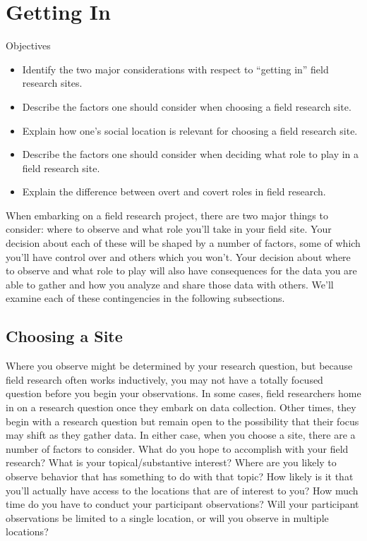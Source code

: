 \section{Getting In}

\begin{center}
	\begin{objbox}{Objectives}
		\begin{itemize}
			\setlength{\itemsep}{0pt}
			\setlength{\parskip}{0pt}
			\setlength{\parsep}{0pt}
			
			\item Identify the two major considerations with respect to “getting in” field research sites.
			\item Describe the factors one should consider when choosing a field research site.
			\item Explain how one’s social location is relevant for choosing a field research site.
			\item Describe the factors one should consider when deciding what role to play in a field research site.
			\item Explain the difference between overt and covert roles in field research.			

		\end{itemize}
	\end{objbox}
\end{center}

When embarking on a field research project, there are two major things to consider: where to observe and what role you’ll take in your field site. Your decision about each of these will be shaped by a number of factors, some of which you’ll have control over and others which you won’t. Your decision about where to observe and what role to play will also have consequences for the data you are able to gather and how you analyze and share those data with others. We’ll examine each of these contingencies in the following subsections.

\subsection{Choosing a Site}

Where you observe might be determined by your research question, but because field research often works inductively, you may not have a totally focused question before you begin your observations. In some cases, field researchers home in on a research question once they embark on data collection. Other times, they begin with a research question but remain open to the possibility that their focus may shift as they gather data. In either case, when you choose a site, there are a number of factors to consider. What do you hope to accomplish with your field research? What is your topical/substantive interest? Where are you likely to observe behavior that has something to do with that topic? How likely is it that you’ll actually have access to the locations that are of interest to you? How much time do you have to conduct your participant observations? Will your participant observations be limited to a single location, or will you observe in multiple locations?

